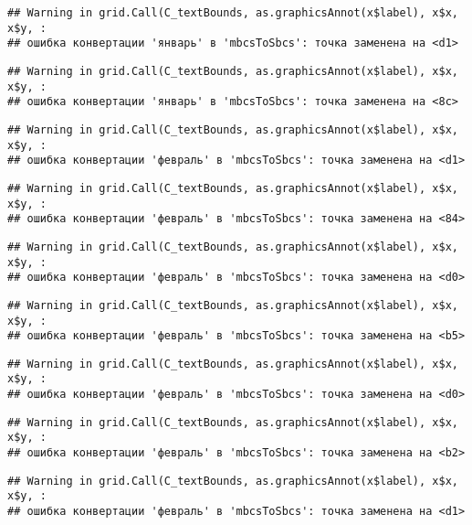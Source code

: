 \documentclass[
]{article}
\begin{document}
\begin{verbatim}
## Warning in grid.Call(C_textBounds, as.graphicsAnnot(x$label), x$x, x$y, :
## ошибка конвертации 'январь' в 'mbcsToSbcs': точка заменена на <d1>
\end{verbatim}

\begin{verbatim}
## Warning in grid.Call(C_textBounds, as.graphicsAnnot(x$label), x$x, x$y, :
## ошибка конвертации 'январь' в 'mbcsToSbcs': точка заменена на <8c>
\end{verbatim}

\begin{verbatim}
## Warning in grid.Call(C_textBounds, as.graphicsAnnot(x$label), x$x, x$y, :
## ошибка конвертации 'февраль' в 'mbcsToSbcs': точка заменена на <d1>
\end{verbatim}

\begin{verbatim}
## Warning in grid.Call(C_textBounds, as.graphicsAnnot(x$label), x$x, x$y, :
## ошибка конвертации 'февраль' в 'mbcsToSbcs': точка заменена на <84>
\end{verbatim}

\begin{verbatim}
## Warning in grid.Call(C_textBounds, as.graphicsAnnot(x$label), x$x, x$y, :
## ошибка конвертации 'февраль' в 'mbcsToSbcs': точка заменена на <d0>
\end{verbatim}

\begin{verbatim}
## Warning in grid.Call(C_textBounds, as.graphicsAnnot(x$label), x$x, x$y, :
## ошибка конвертации 'февраль' в 'mbcsToSbcs': точка заменена на <b5>
\end{verbatim}

\begin{verbatim}
## Warning in grid.Call(C_textBounds, as.graphicsAnnot(x$label), x$x, x$y, :
## ошибка конвертации 'февраль' в 'mbcsToSbcs': точка заменена на <d0>
\end{verbatim}

\begin{verbatim}
## Warning in grid.Call(C_textBounds, as.graphicsAnnot(x$label), x$x, x$y, :
## ошибка конвертации 'февраль' в 'mbcsToSbcs': точка заменена на <b2>
\end{verbatim}

\begin{verbatim}
## Warning in grid.Call(C_textBounds, as.graphicsAnnot(x$label), x$x, x$y, :
## ошибка конвертации 'февраль' в 'mbcsToSbcs': точка заменена на <d1>
\end{verbatim}
\end{document}
